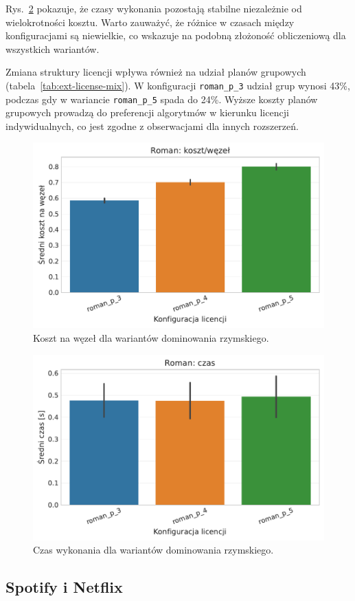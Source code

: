 Rys.~\ref{fig:ext-roman-time} pokazuje, że czasy wykonania pozostają stabilne niezależnie od wielokrotności kosztu. Warto zauważyć, że różnice w czasach między konfiguracjami są niewielkie, co wskazuje na podobną złożoność obliczeniową dla wszystkich wariantów.

Zmiana struktury licencji wpływa również na udział planów grupowych (tabela~\ref{tab:ext-license-mix}). W konfiguracji \texttt{roman\_p\_3} udział grup wynosi 43\%, podczas gdy w wariancie \texttt{roman\_p\_5} spada do 24\%. Wyższe koszty planów grupowych prowadzą do preferencji algorytmów w kierunku licencji indywidualnych, co jest zgodne z obserwacjami dla innych rozszerzeń.

\begin{figure}[H]
  \centering
  \includegraphics[width=0.6\linewidth]{assets/figures/extensions/static/roman_cost_per_node_comparison.pdf}
  \caption{Koszt na węzeł dla wariantów dominowania rzymskiego.}
  \label{fig:ext-roman-cost}
\end{figure}

\begin{figure}[H]
  \centering
  \includegraphics[width=0.6\linewidth]{assets/figures/extensions/static/roman_time_comparison.pdf}
  \caption{Czas wykonania dla wariantów dominowania rzymskiego.}
  \label{fig:ext-roman-time}
\end{figure}

\subsection{Spotify i Netflix}


